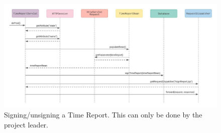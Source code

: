\documentclass{article}
\begin{document}
\begin{figure}[H]
    \centering
    \includegraphics[scale=0.5]{images/signUnsignReports.jpeg}
    \caption{Signing/unsigning a Time Report. This can only be done by the project leader.}
    \label{fig:signunsign}
\end{figure}

\subsection{}

\end{document}

